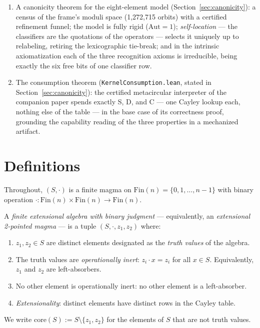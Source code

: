 \documentclass[sigconf,screen]{acmart}
\newcommand{\dotop}{\cdot}
\newcommand{\Fin}{\mathrm{Fin}}
\newcommand{\core}{\mathrm{core}}
\theoremstyle{remark}
\begin{document}
\begin{enumerate}
    function of the other two --- at any size.
  \item A canonicity theorem for the eight-element model
    (Section~\ref{sec:canonicity}): a census of the frame's moduli
    space (1{,}272{,}715 orbits) with a certified refinement funnel;
    the model is fully rigid ($\mathrm{Aut} = 1$); \emph{self-location}
    --- the classifiers are the quotations of the operators --- selects
    it uniquely up to relabeling, retiring the lexicographic tie-break;
    and in the intrinsic axiomatization each of the three recognition
    axioms is irreducible, being exactly the six free bits of one
    classifier row.
  \item The consumption theorem (\texttt{KernelConsumption.lean},
    stated in Section~\ref{sec:canonicity}): the certified metacircular
    interpreter of the companion paper spends exactly S, D, and C ---
    one Cayley lookup each, nothing else of the table --- in the base
    case of its correctness proof, grounding the capability reading of
    the three properties in a mechanized artifact.
\end{enumerate}


\section{Definitions}
\label{sec:definitions}

Throughout, $(S, \dotop)$ is a finite magma on
$\Fin(n) = \{0, 1, \ldots, n-1\}$ with binary operation
$\dotop : \Fin(n) \times \Fin(n) \to \Fin(n)$.

\begin{definition}
\label{def:epm}
A \emph{finite extensional algebra with binary judgment} --- equivalently,
an \emph{extensional 2-pointed magma} --- is a tuple
$(S, \dotop, z_1, z_2)$ where:
\begin{enumerate}
  \item $z_1, z_2 \in S$ are distinct elements designated as the
    \emph{truth values} of the algebra.
  \item The truth values are \emph{operationally inert}: $z_i \dotop x = z_i$
    for all $x \in S$. Equivalently, $z_1$ and $z_2$ are left-absorbers.
  \item No other element is operationally inert: no other element is a
    left-absorber.
  \item \emph{Extensionality}: distinct elements have distinct rows in
    the Cayley table.
\end{enumerate}
We write $\core(S) := S \setminus \{z_1, z_2\}$ for the elements of $S$
that are not truth values.
\end{definition}
\end{document}
